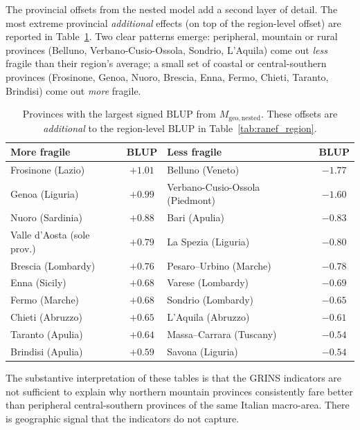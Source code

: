 \documentclass[11pt,a4paper]{article}
\begin{document}
The provincial offsets from the nested model add a second layer of
detail. The most extreme provincial \emph{additional} effects (on top
of the region-level offset) are reported in Table~\ref{tab:ranef_prov}.
Two clear patterns emerge: peripheral, mountain or rural provinces
(Belluno, Verbano-Cusio-Ossola, Sondrio, L'Aquila) come out
\emph{less} fragile than their region's average; a small set of
coastal or central-southern provinces (Frosinone, Genoa, Nuoro,
Brescia, Enna, Fermo, Chieti, Taranto, Brindisi) come out
\emph{more} fragile.

\begin{table}[h!]
  \centering
  \begin{tabular}{lc lc}
    \toprule
    More fragile & BLUP & Less fragile & BLUP \\
    \midrule
    Frosinone (Lazio)              & \(+1.01\) & Belluno (Veneto)                 & \(-1.77\) \\
    Genoa (Liguria)                & \(+0.99\) & Verbano-Cusio-Ossola (Piedmont)  & \(-1.60\) \\
    Nuoro (Sardinia)               & \(+0.88\) & Bari (Apulia)                    & \(-0.83\) \\
    Valle d'Aosta (sole prov.)     & \(+0.79\) & La Spezia (Liguria)              & \(-0.80\) \\
    Brescia (Lombardy)             & \(+0.76\) & Pesaro--Urbino (Marche)          & \(-0.78\) \\
    Enna (Sicily)                  & \(+0.68\) & Varese (Lombardy)                & \(-0.69\) \\
    Fermo (Marche)                 & \(+0.68\) & Sondrio (Lombardy)               & \(-0.65\) \\
    Chieti (Abruzzo)               & \(+0.65\) & L'Aquila (Abruzzo)               & \(-0.61\) \\
    Taranto (Apulia)               & \(+0.64\) & Massa--Carrara (Tuscany)         & \(-0.54\) \\
    Brindisi (Apulia)              & \(+0.59\) & Savona (Liguria)                 & \(-0.54\) \\
    \bottomrule
  \end{tabular}
  \caption{Provinces with the largest signed BLUP from
    \(M_{\mathrm{geo,nested}}\). These offsets are \emph{additional}
    to the region-level BLUP in Table~\ref{tab:ranef_region}.}
  \label{tab:ranef_prov}
\end{table}

The substantive interpretation of these tables is that the GRINS
indicators are not sufficient to explain why northern mountain
provinces consistently fare better than peripheral central-southern
provinces of the same Italian macro-area. There is geographic signal
that the indicators do not capture.
\end{document}
